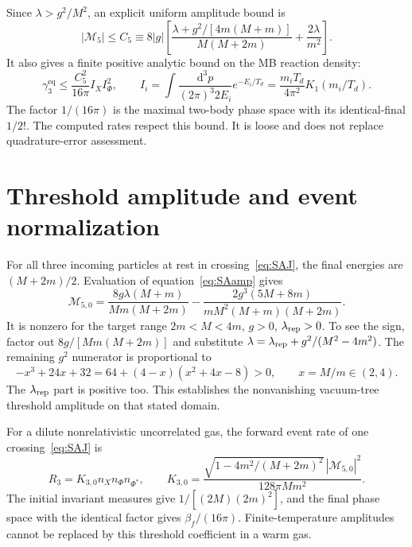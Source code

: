 \documentclass[11pt]{article}
\newcommand{\dd}{\mathrm d}
\newcommand{\eq}{\mathrm{eq}}
\begin{document}
Since $\lambda>g^2/M^2$, an explicit uniform amplitude bound is
\begin{equation}
 |\mathcal M_5|\le C_5\equiv8|g|
 \left[\frac{\lambda+g^2/[4m(M+m)]}{M(M+2m)}
 +\frac{2\lambda}{m^2}\right].
\end{equation}
It also gives a finite positive analytic bound on the MB reaction density:
\begin{equation}
 \gamma_3^\eq\le\frac{C_5^2}{16\pi}I_X I_\Phi^2,
 \qquad I_i=\int\frac{\dd^3p}{(2\pi)^3 2E_i}e^{-E_i/T_d}
 =\frac{m_iT_d}{4\pi^2}K_1(m_i/T_d).
\end{equation}
The factor $1/(16\pi)$ is the maximal two-body phase space with its
identical-final $1/2!$. The computed rates respect this bound. It is loose
and does not replace quadrature-error assessment.

\section{Threshold amplitude and event normalization}
For all three incoming particles at rest in crossing~\eqref{eq:SAJ},
the final energies are $(M+2m)/2$. Evaluation of equation~\eqref{eq:SAamp}
gives
\begin{equation}
 \mathcal M_{5,0}=
 \frac{8g\lambda(M+m)}{Mm(M+2m)}
 -\frac{2g^3(5M+8m)}{mM^2(M+m)(M+2m)}.
\end{equation}
It is nonzero for the target range $2m<M<4m$, $g>0$,
$\lambda_{\rm rep}>0$. To see the sign, factor out
$8g/[Mm(M+2m)]$ and substitute
$\lambda=\lambda_{\rm rep}+g^2/(M^2-4m^2)$.
The remaining $g^2$ numerator is proportional to
\begin{equation}
 -x^3+24x+32=64+(4-x)(x^2+4x-8)>0,\qquad x=M/m\in(2,4).
\end{equation}
The $\lambda_{\rm rep}$ part is positive too. This establishes the
nonvanishing vacuum-tree threshold amplitude on that stated domain.

For a dilute nonrelativistic uncorrelated gas, the forward event rate of
one crossing~\eqref{eq:SAJ} is
\begin{equation}
 R_3=K_{3,0}n_Xn_\Phi n_{\Phi^*},\qquad
 K_{3,0}=\frac{\sqrt{1-4m^2/(M+2m)^2}\,|\mathcal M_{5,0}|^2}
 {128\pi M m^2}.
\end{equation}
The initial invariant measures give $1/[(2M)(2m)^2]$, and the final phase
space with the identical factor gives $\beta_f/(16\pi)$. Finite-temperature
amplitudes cannot be replaced by this threshold coefficient in a warm gas.
\end{document}
